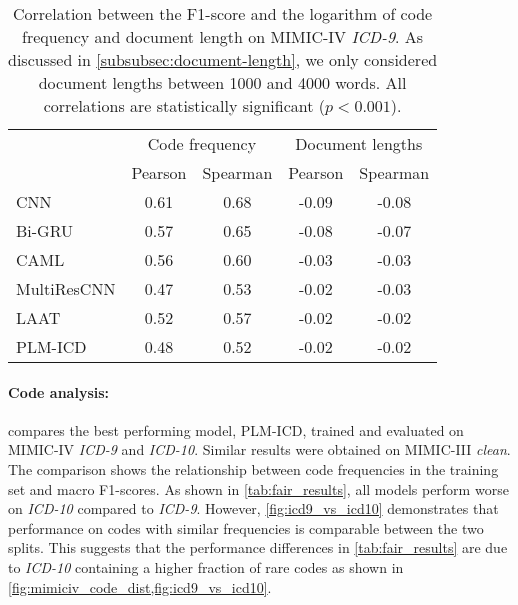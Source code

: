 {\begin{table}
    \centering
    \caption[Correlation between the F1-score and the logarithm of code frequency and document length on MIMIC-IV \textit{ICD-9}.]{Correlation between the F1-score and the logarithm of code frequency and document length on MIMIC-IV \textit{ICD-9}. As discussed in \cref{subsubsec:document-length}, we only considered document lengths between 1000 and 4000 words. All correlations are statistically significant ($p<0.001$).}
    \label{tab:correlations}
    \begin{tabular}{lcccc}
        \toprule
        & \multicolumn{2}{c}{Code frequency} & \multicolumn{2}{c}{Document lengths}\\
        \cmidrule(lr){2-3}\cmidrule(lr){4-5}
        & Pearson & Spearman & Pearson & Spearman \\
        \midrule
        CNN  & 0.61 & 0.68 & -0.09 & -0.08 \\
        Bi-GRU & 0.57 & 0.65 & -0.08 & -0.07 \\
        CAML & 0.56 & 0.60 & -0.03 & -0.03   \\
        MultiResCNN & 0.47 & 0.53 & -0.02 & -0.03  \\
        LAAT & 0.52 & 0.57 & -0.02 & -0.02 \\
        PLM-ICD & 0.48 & 0.52 & -0.02 & -0.02   \\
        \bottomrule
    \end{tabular}
\end{table}


\paragraph{Code analysis:}

 compares the best performing model, PLM-ICD, trained and evaluated on MIMIC-IV \textit{ICD-9} and \textit{ICD-10}. Similar results were obtained on MIMIC-III \textit{clean}.
The comparison shows the relationship between code frequencies in the training set and macro F1-scores. As shown in \cref{tab:fair_results}, all models perform worse on \textit{ICD-10} compared to \textit{ICD-9}. However, \cref{fig:icd9_vs_icd10} demonstrates that performance on codes with similar frequencies is comparable between the two splits. This suggests that the performance differences in \cref{tab:fair_results} are due to \textit{ICD-10} containing a higher fraction of rare codes as shown in \cref{fig:mimiciv_code_dist,fig:icd9_vs_icd10}.

}

